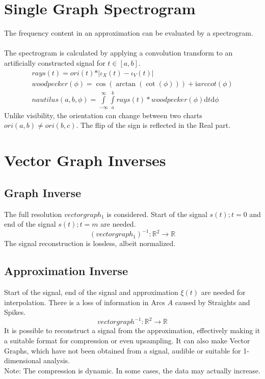 \documentclass{report}
\begin{document}
\chapter{Single Graph Spectrogram}
The frequency content in an approximation can be evaluated by a spectrogram.\\\\
The spectrogram is calculated by applying a convolution transform to an artificially constructed signal for $t \in [a,b]$.
\begin{align}
rays(t)=ori(t)*\vert\iota_{X}(t)-\iota_{V}(t)\vert\\
woodpecker(\phi)=\cos(\arctan(\cot(\phi))) + \mathrm{i} arccot(\phi)\\
nautilus(a,b,\phi)=\int \limits _{-\infty}^{\infty}\int \limits _{a}^{b}rays(t)*woodpecker(\phi)\mathrm{d}t\mathrm{d}\phi
\end{align}
Unlike visibility, the orientation can change between two charts $ori(a,b)\neq ori(b,c)$. The flip of the sign is reflected in the Real part.

\chapter{Vector Graph Inverses}
\section{Graph Inverse}
The full resolution $vectorgraph_{1}$ is considered. Start of the signal $s(t);t=0$ and end of the signal $s(t);t=m$ are needed.
\begin{equation}
(vectorgraph_{1})^{-1}: \mathbb{R}^2 \rightarrow \mathbb{R}
\end{equation}
The signal reconstruction is lossless, albeit normalized.
\section{Approximation Inverse}
Start of the signal, end of the signal and approximation $\xi(t)$ are needed for interpolation. There is a loss of information in Arcs $A$ caused by Straights and Spikes.
\begin{equation}
vectorgraph^{-1}: \mathbb{R}^2 \rightarrow \mathbb{R}
\end{equation}
It is possible to reconstruct a signal from the approximation, effectively making it a suitable format for compression or even upsampling. It can also make Vector Graphs, which have not been obtained from a signal, audible or suitable for 1-dimensional analysis.\\
Note: The compression is dynamic. In some cases, the data may actually increase.
\end{document}

